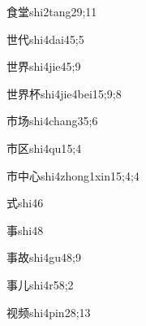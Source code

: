 \begin{verbete}{食堂}{shi2tang2}{9;11}
\end{verbete}

\begin{verbete}{世代}{shi4dai4}{5;5}
\end{verbete}

\begin{verbete}{世界}{shi4jie4}{5;9}
\end{verbete}

\begin{verbete}{世界杯}{shi4jie4bei1}{5;9;8}
\end{verbete}

\begin{verbete}{市场}{shi4chang3}{5;6}
\end{verbete}

\begin{verbete}{市区}{shi4qu1}{5;4}
\end{verbete}

\begin{verbete}{市中心}{shi4zhong1xin1}{5;4;4}
\end{verbete}

\begin{verbete}{式}{shi4}{6}
\end{verbete}

\begin{verbete}{事}{shi4}{8}
\end{verbete}

\begin{verbete}{事故}{shi4gu4}{8;9}
\end{verbete}

\begin{verbete}{事儿}{shi4r5}{8;2}
\end{verbete}

\begin{verbete}{视频}{shi4pin2}{8;13}
\end{verbete}

